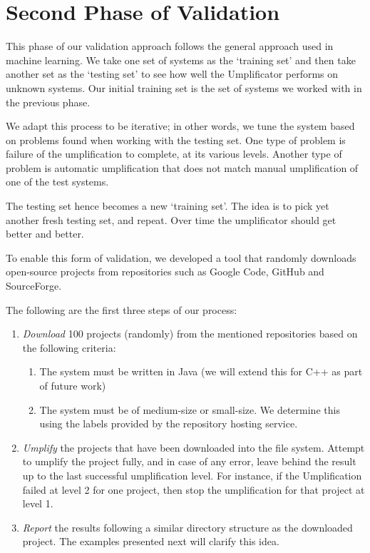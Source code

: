\section{Second Phase of Validation}
This phase of our validation approach follows the general approach used in machine learning. We take one set of systems as the `training set' and then take another set as the `testing set' to see how well the Umplificator performs on unknown systems.
Our initial training set is the set of systems we worked with in the previous phase.

We adapt this process to be iterative; in other words, we  tune the system based on problems found when working with the testing set. One type of problem is  failure of the umplification to complete, at its various levels. Another type of problem is automatic umplification that does not match manual umplification of one of the test systems.

The testing set hence becomes a new `training set'. The idea is to pick yet another fresh testing set, and repeat. Over time the umplificator should get better and better.

To enable this form of validation, we developed a tool that randomly downloads open-source projects from repositories such as Google Code, GitHub and SourceForge.

The following are the first three steps of our process:

\begin{enumerate}
\item \textit{Download} 100 projects (randomly) from the mentioned repositories based on the following criteria: 
	\begin{enumerate}
	\item The system must be written in Java (we will extend this for C++ as part of future work)
	\item The system must be of medium-size or small-size. We determine this using the labels provided by the repository hosting service.
	\end{enumerate}
\item \textit{Umplify} the projects that have been downloaded into the file system. Attempt to umplify the project fully, and in case of any error, leave behind the result up to the last successful umplification level. For instance, if the Umplification failed at level 2 for one project, then stop the umplification for that project at level 1.

\item \textit{Report} the results following a similar directory structure as the downloaded project. The examples presented next will clarify this idea.
\end{enumerate}

